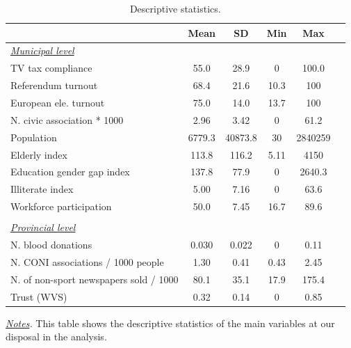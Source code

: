 \begin{table}\centering\begin{threeparttable}
\caption{Descriptive statistics.}\label{tab:ds}
\begin{tabular}{lccccc} \hline \hline
& Mean & SD  & Min  & Max  \\  \hline 
\textit{\underline{Municipal level}} & & & & \\
TV tax compliance&     55.0&     28.9&        0&    100.0\\
Referendum turnout&     68.4&     21.6&     10.3&      100\\
European ele. turnout&     75.0&     14.0&     13.7&      100\\
N. civic association * 1000&     2.96&     3.42&        0&     61.2\\
Population      &   6779.3&  40873.8&       30&  2840259\\
Elderly index   &    113.8&    116.2&     5.11&     4150\\
Education gender gap index&    137.8&     77.9&        0&   2640.3\\
Illiterate index&     5.00&     7.16&        0&     63.6\\
Workforce participation&     50.0&     7.45&     16.7&     89.6\\
& & & & & \\
%
%
\textit{\underline{Provincial level}} & & & & \\
N. blood donations&    0.030&    0.022&        0&     0.11\\
N. CONI associations / 1000 people&     1.30&     0.41&     0.43&     2.45\\
N. of non-sport newspapers sold / 1000&     80.1&     35.1&     17.9&    175.4\\
Trust (WVS)     &     0.32&     0.14&        0&     0.85\\
\hline
\end{tabular} \begin{tablenotes} \item \scriptsize{\textit{\underline{Notes}.} This table shows the descriptive statistics of the main variables at our disposal in the analysis. } \end{tablenotes} \end{threeparttable} \end{table}
